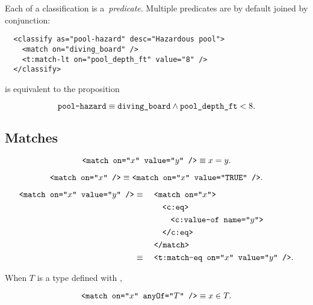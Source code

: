 Each  of a classification is a~\emph{predicate}.
Multiple predicates are by default joined by conjunction:

\begin{lstlisting}
  <classify as="pool-hazard" desc="Hazardous pool">
    <match on="diving_board" />
    <t:match-lt on="pool_depth_ft" value="8" />
  </classify>
\end{lstlisting}

\noindent
is equivalent to the proposition

\begin{equation*}
  \texttt{pool-hazard} \equiv \texttt{diving\_board}
    \land \texttt{pool\_depth\_ft} < 8.
\end{equation*}


\subsection{Matches}
\begin{definition}
  \begin{equation*}
    \texttt{<match on="$x$" value="$y$" />} \equiv x = y.
  \end{equation*}
\end{definition}

\begin{definition}
  \begin{equation*}
    \texttt{<match on="$x$" />}
      \equiv \texttt{<match on="$x$" value="TRUE" />}.
  \end{equation*}
\end{definition}

\begin{definition}
  \begin{alignat*}{2}
    \texttt{<match on="$x$" value="$y$" />}
      &\equiv {}&&\texttt{<match on="$x$">} \\
      &         &&\quad \texttt{<c:eq>} \\
      &         &&\quad\quad \texttt{<c:value-of name="$y$">} \\
      &         &&\quad \texttt{</c:eq>} \\
      &         &&\texttt{</match>} \\
      &\equiv {}&&\texttt{<t:match-eq on="$x$" value="$y$" />}.
  \end{alignat*}
\end{definition}

\begin{definition}
  When $T$ is a type defined with ,

  \begin{equation*}
    \texttt{<match on="$x$" anyOf="$T$" />} \equiv x \in T.
  \end{equation*}
\end{definition}

